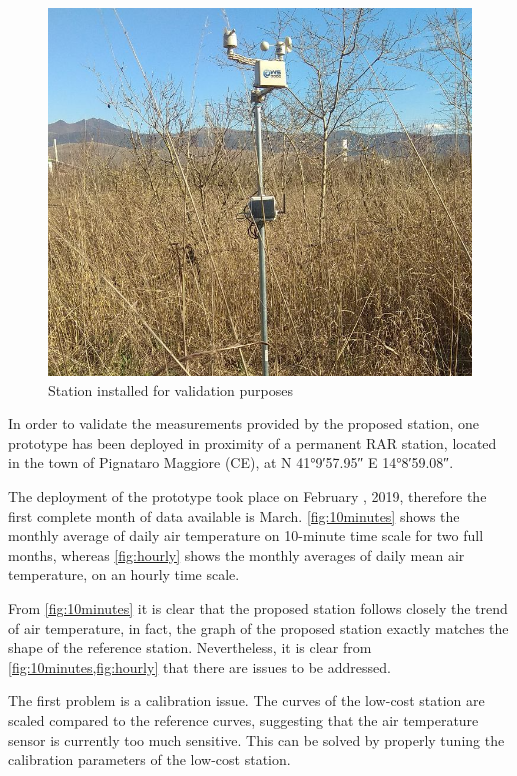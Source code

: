 \documentclass[conference]{IEEEtran}
\begin{document}
\begin{figure}
    \centering
    \includegraphics[scale=.35]{deployment_pignataro_cut.png}
    \caption{Station installed for validation purposes}
    \label{fig:deployment}
\end{figure}


In order to validate the measurements provided by the proposed station, one prototype has been deployed in proximity of a permanent RAR station, located in the town of Pignataro Maggiore (CE), at N \ang{41;9;57.95} E \ang{14;8;59.08}.

The deployment of the prototype took place on February , 2019,  therefore the first complete month of data available is March. 
\cref{fig:10minutes} shows the monthly average of daily air temperature on 10-minute time scale for two full months, whereas \cref{fig:hourly} shows the monthly averages of daily mean air temperature, on an hourly time scale.

From \cref{fig:10minutes} it is clear that the proposed station follows closely the trend of air temperature, in fact, the graph of the proposed station exactly matches the shape of the reference station. Nevertheless, it is clear from \cref{fig:10minutes,fig:hourly} that there are issues to be addressed. 

The first problem is a calibration issue. The curves of the low-cost station are scaled compared to the reference curves, suggesting that the air temperature sensor is currently too much sensitive. This can be solved by properly tuning the calibration parameters of the low-cost station.
\end{document}
